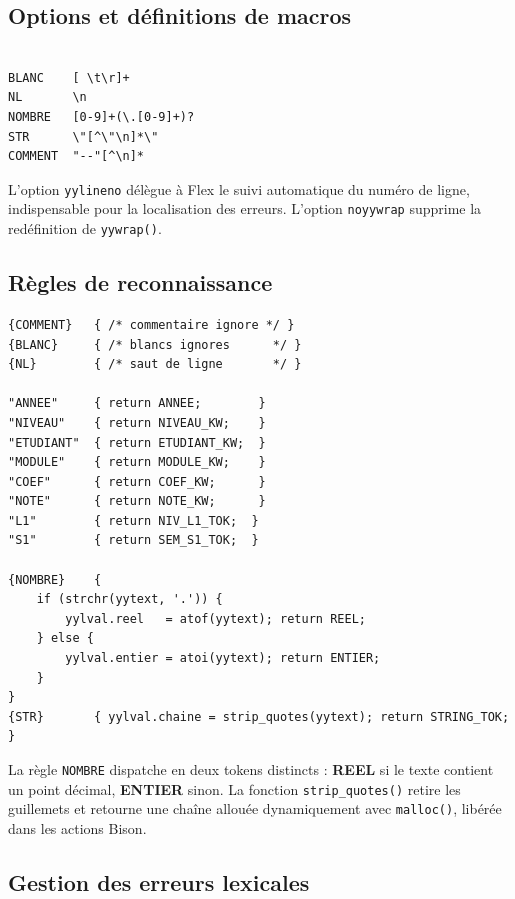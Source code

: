 \documentclass[10pt,a4paper]{article}
\begin{document}
\subsection{Options et définitions de macros}

\begin{lstlisting}[style=styleFlex, caption={Options et macros dans \texttt{lexer.l}}]
%option noyywrap yylineno warn noinput nounput

BLANC    [ \t\r]+
NL       \n
NOMBRE   [0-9]+(\.[0-9]+)?
STR      \"[^\"\n]*\"
COMMENT  "--"[^\n]*
\end{lstlisting}

L'option \texttt{yylineno} délègue à Flex le suivi automatique du numéro de ligne,
indispensable pour la localisation des erreurs. L'option \texttt{noyywrap} supprime
la redéfinition de \texttt{yywrap()}.

\subsection{Règles de reconnaissance}

\begin{lstlisting}[style=styleFlex, caption={Extrait des règles lexicales --- mots-clés et littéraux}]
{COMMENT}   { /* commentaire ignore */ }
{BLANC}     { /* blancs ignores      */ }
{NL}        { /* saut de ligne       */ }

"ANNEE"     { return ANNEE;        }
"NIVEAU"    { return NIVEAU_KW;    }
"ETUDIANT"  { return ETUDIANT_KW;  }
"MODULE"    { return MODULE_KW;    }
"COEF"      { return COEF_KW;      }
"NOTE"      { return NOTE_KW;      }
"L1"        { return NIV_L1_TOK;  }
"S1"        { return SEM_S1_TOK;  }

{NOMBRE}    {
    if (strchr(yytext, '.')) {
        yylval.reel   = atof(yytext); return REEL;
    } else {
        yylval.entier = atoi(yytext); return ENTIER;
    }
}
{STR}       { yylval.chaine = strip_quotes(yytext); return STRING_TOK; }
\end{lstlisting}

La règle \texttt{NOMBRE} dispatche en deux tokens distincts : \textbf{REEL} si le texte
contient un point décimal, \textbf{ENTIER} sinon. La fonction \texttt{strip\_quotes()}
retire les guillemets et retourne une chaîne allouée dynamiquement avec \texttt{malloc()},
libérée dans les actions Bison.

\subsection{Gestion des erreurs lexicales}
\end{document}
